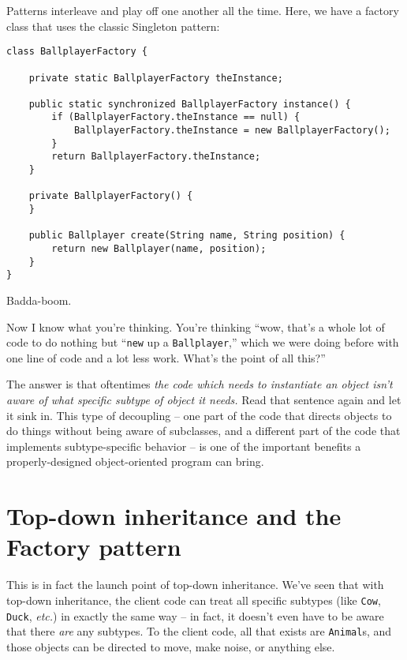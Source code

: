 Patterns interleave and play off one another all the time. Here, we have a
factory class that uses the classic Singleton pattern:

\begin{Verbatim}[fontsize=\scriptsize,samepage=true,frame=single]
class BallplayerFactory {

    private static BallplayerFactory theInstance;
    
    public static synchronized BallplayerFactory instance() {
        if (BallplayerFactory.theInstance == null) {
            BallplayerFactory.theInstance = new BallplayerFactory();
        }
        return BallplayerFactory.theInstance;
    }

    private BallplayerFactory() {
    }

    public Ballplayer create(String name, String position) {
        return new Ballplayer(name, position);
    }
}
\end{Verbatim}

Badda-boom.

Now I know what you're thinking. You're thinking ``wow, that's a whole lot of
code to do nothing but ``\texttt{new} up a \texttt{Ballplayer},'' which we were
doing before with one line of code and a lot less work. What's the point of
all this?''

The answer is that oftentimes \textit{the code which needs to instantiate an
object isn't aware of what specific subtype of object it needs.} Read that
sentence again and let it sink in. This type of decoupling -- one part of the
code that directs objects to do things without being aware of subclasses, and
a different part of the code that implements subtype-specific behavior -- is
one of the important benefits a properly-designed object-oriented program can
bring.

\section[Top-down inheritance]
{\large Top-down inheritance and the Factory pattern}

This is in fact the launch point of top-down inheritance. We've seen that with
top-down inheritance, the client code can treat all specific subtypes (like
\texttt{Cow}, \texttt{Duck}, \textit{etc.}) in exactly the same way -- in
fact, it doesn't even have to be aware that there \textit{are} any subtypes.
To the client code, all that exists are \texttt{Animal}s, and those objects
can be directed to move, make noise, or anything else.

